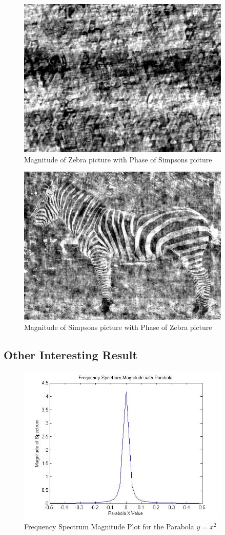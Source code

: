 \documentclass[11pt,psfig]{article}
\begin{document}
\begin{figure}[H]
\centering
\includegraphics[height=3in]{mag_zebra_phase_simpsons.jpg}
\caption{Magnitude of Zebra picture with Phase of Simpsons picture}
\end{figure}

\begin{figure}[H]
\centering
\includegraphics[height=3in]{mag_simpsons_phase_zebra.jpg}
\caption{Magnitude of Simpsons picture with Phase of Zebra picture}
\end{figure}

\subsection*{Other Interesting Result}

\begin{figure}[H]
\centering
\includegraphics[height=3in]{prob6plot_freqParabola.jpg}
\caption{Frequency Spectrum Magnitude Plot for the Parabola $y=x^2$}
\end{figure}
\end{document}
